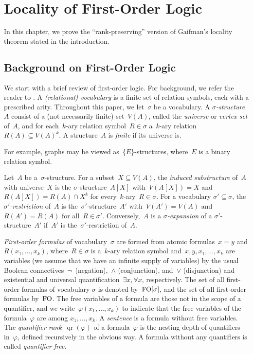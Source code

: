 \documentclass[11pt]{article}
\numberwithin{equation}{section}
\newcommand{\FO}{\textup{FO}}
\renewcommand{\phi}{\varphi}
\newcommand{\qr}{\operatorname{qr}}
\begin{document}
\section{Locality of First-Order Logic}\label{sec:local}


In this chapter, we prove the ``rank-preserving'' version of
Gaifman's locality theorem stated in the introduction.

\subsection{Background on First-Order Logic}
We start with a brief review of first-order logic. For background, we
refer the reader to \cite{EbbinghausFluTho94}. A \emph{(relational) vocabulary} is
a finite set of relation symbols, each with a prescribed
arity. Throughout this paper, we let~$\sigma$ be a vocabulary.  A
\emph{$\sigma$-structure} $A$ consist of a (not necessarily finite) set~$V(A)$, called the
\emph{universe} or \emph{vertex set} of~$A$, and for each~$k$-ary
relation symbol~$R\in\sigma$ a~$k$-ary relation~$R(A)\subseteq
V(A)^k$. A structure~$A$ is \emph{finite} if its universe is. 

For example, graphs may be viewed as~$\{E\}$-structures, where~$E$ is
a binary relation symbol.

Let~$A$ be a~$\sigma$-structure. For a subset~$X\subseteq V(A)$, the
\emph{induced substructure} of~$A$ with universe~$X$ is the
$\sigma$-structure~$A[X]$ with~$V(A[X])=X$ and~$R(A[X])=R(A)\cap X^k$
for every~$k$-ary~$R\in\sigma$. For a vocabulary
$\sigma'\subseteq\sigma$, the \emph{$\sigma'$-restriction} of~$A$ is
the~$\sigma'$-structure~$A'$ with~$V(A')=V(A)$ and~$R(A')=R(A)$ for
all~$R\in\sigma'$. Conversely,~$A$ is a \emph{$\sigma$-expansion} of a
$\sigma'$-structure~$A'$ if~$A'$ is the~$\sigma'$-restriction of~$A$.

\emph{First-order formulas} of vocabulary~$\sigma$ are formed from
atomic formulas~$x=y$ and $R(x_1,\ldots,x_k)$, where~$R\in\sigma$ is
a~$k$-ary relation symbol and~$x,y,x_1,\ldots,x_k$ are variables (we
assume that we have an infinite supply of variables) by the usual
Boolean connectives~$\neg$~(negation),~$\wedge$ (conjunction),
and~$\vee$ (disjunction) and existential and universal
quantification~$\exists x,\forall x$, respectively. The set of all
first-order formulas of vocabulary $\sigma$ is denoted
by~$\FO[\sigma]$, and the set of all first-order formulas
by~$\FO$. The free variables of a formula are those not in the scope
of a quantifier, and we write~$\phi(x_1,\ldots,x_k)$ to indicate that
the free variables of the formula~$\phi$ are among $x_1,\ldots,x_k$. A
\emph{sentence} is a formula without free variables. The
\emph{quantifier rank}~$\qr(\phi)$ of a formula~$\phi$ is the nesting
depth of quantifiers in~$\phi$, defined recursively in the obvious
way. A formula without any quantifiers is called
\emph{quantifier-free}.
\end{document}
